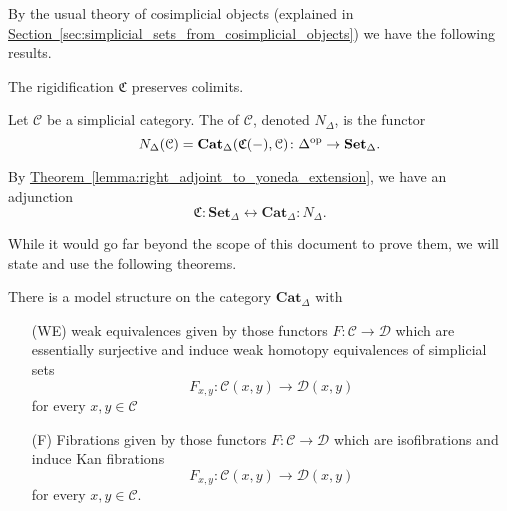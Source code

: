 By the usual theory of cosimplicial objects (explained in \hyperref[sec:simplicial_sets_from_cosimplicial_objects]{Section~\ref*{sec:simplicial_sets_from_cosimplicial_objects}}) we have the following results.

\begin{lemma}
	\label{lemma:thickening_preserves_colimits}
	The rigidification $\mathfrak{C}$ preserves colimits.
\end{lemma}

\begin{definition}
	\label{def:homotopy-coherent_nerve}
	Let $\mathcal{C}$ be a simplicial category. The  of $\mathcal{C}$, denoted $N_{\Delta}$, is the functor
	\begin{equation*}
	N_{\Delta}(\mathcal{C}) = \mathbf{Cat}_{\Delta}(\mathfrak{C}(-), \mathcal{C})\colon \Delta^{\mathrm{op}} \to \mathbf{Set}_{\Delta}.
	\end{equation*}
\end{definition}

By \hyperref[lemma:right_adjoint_to_yoneda_extension]{Theorem~\ref*{lemma:right_adjoint_to_yoneda_extension}}, we have an adjunction
\begin{equation*}
\mathfrak{C} : \mathbf{Set}_{\Delta} \leftrightarrow \mathbf{Cat}_{\Delta} : N_{\Delta}.
\end{equation*}

While it would go far beyond the scope of this document to prove them, we will state and use the following theorems. 

\begin{theorem}[Bergner]
	There is a model structure on the category $\mathbf{Cat}_{\Delta}$ with 
	\begin{itemize}
		\item[(WE)] weak equivalences given by those functors $F:\mathcal{C}\to \mathcal{D}$ which are essentially surjective and induce weak homotopy equivalences of simplicial sets 
		\[
		F_{x,y}:\mathcal{C}(x,y)\to \mathcal{D}(x,y)
		\]
		for every $x,y\in \mathcal{C}$
		\item[(F)] Fibrations given by those functors $F:\mathcal{C}\to \mathcal{D}$ which are isofibrations and induce Kan fibrations 
		\[
		F_{x,y}:\mathcal{C}(x,y)\to \mathcal{D}(x,y)
		\]
		for every $x,y\in \mathcal{C}$.
	\end{itemize}
\end{theorem}

